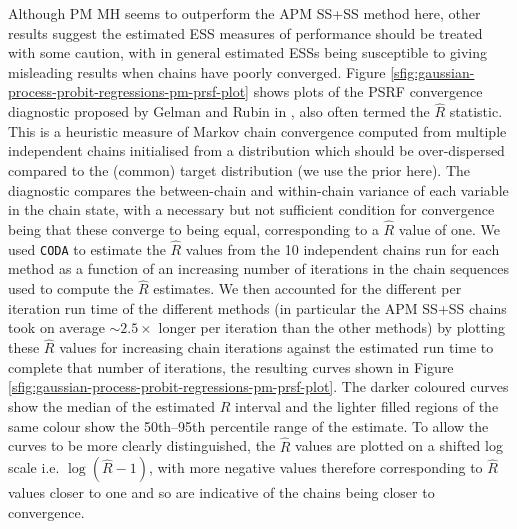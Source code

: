 Although \ac{PM} \ac{MH} seems to outperform the \ac{APM} \ac{SS}+\ac{SS} method here, other results suggest the estimated \ac{ESS} measures of performance should be treated with some caution, with in general estimated \acp{ESS} being susceptible to giving misleading results when chains have poorly converged. Figure \ref{sfig:gaussian-process-probit-regressions-pm-prsf-plot} shows plots of the \ac{PSRF} convergence diagnostic proposed by Gelman and Rubin in \citep{gelman1992inference}, also often termed the $\hat{R}$ statistic. This is a heuristic measure of Markov chain convergence computed from multiple independent chains initialised from a distribution which should be over-dispersed compared to the (common) target distribution (we use the prior here). The diagnostic compares the between-chain and within-chain variance of each variable in the chain state, with a necessary but not sufficient condition for convergence being that these converge to being equal, corresponding to a $\hat{R}$ value of one. We used \texttt{CODA} to estimate the $\hat{R}$ values from the 10 independent chains run for each method as a function of an increasing number of iterations in the chain sequences used to compute the $\hat{R}$ estimates. We then accounted for the different per iteration run time of the different methods (in particular the \ac{APM} \ac{SS}+\ac{SS} chains took on average $\sim 2.5\times$ longer per iteration than the other methods) by plotting these $\hat{R}$ values for increasing chain iterations against the estimated run time to complete that number of iterations, the resulting curves shown in Figure \ref{sfig:gaussian-process-probit-regressions-pm-prsf-plot}. The darker coloured curves show the median of the estimated $\hat{R}$ interval and the lighter filled regions of the same colour show the 50th--95th percentile range of the estimate. To allow the curves to be more clearly distinguished, the $\hat{R}$ values are plotted on a shifted log scale i.e. $\log(\hat{R} - 1)$, with more negative values therefore corresponding to $\hat{R}$ values closer to one and so are indicative of the chains being closer to convergence.

